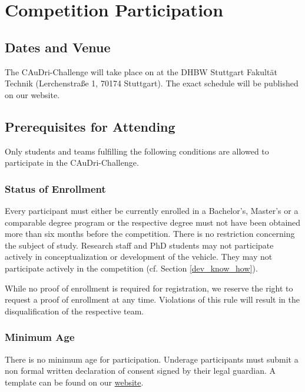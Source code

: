 \chapter{Competition Participation}

\section{Dates and Venue}

The CAuDri-Challenge \yearofchallenge{} will take place on \dateofchallenge{} at the DHBW Stuttgart Fakultät Technik (Lerchenstraße 1, 70174 Stuttgart).
The exact schedule will be published on our website.

\section{Prerequisites for Attending}

Only students and teams fulfilling the following conditions are allowed to participate in the CAuDri-Challenge.

\subsection{Status of Enrollment}

Every participant must either be currently enrolled in a Bachelor’s, Master’s or a comparable degree program or the respective degree must not have been obtained more than six months before the competition.
There is no restriction concerning the subject of study.
Research staff and PhD students may not participate actively in conceptualization or development of the vehicle.
They may not participate actively in the competition (cf. Section \ref{dev_know_how}).

While no proof of enrollment is required for registration, we reserve the right to request a proof of enrollment at any time.
Violations of this rule will result in the disqualification of the respective team.

\subsection{Minimum Age}

There is no minimum age for participation. Underage participants must submit a non formal written declaration of consent signed by their legal guardian.
A template can be found on our \href{https://caudri-challenge.de/documents/Einverst%C3%A4ndniserkl%C3%A4rung_Minderj%C3%A4hrige.pdf}{website}.

